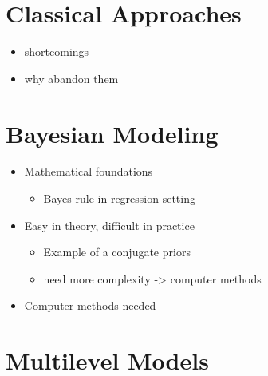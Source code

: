 \documentclass[
]{article}
\providecommand{\tightlist}{%
  \setlength{\itemsep}{0pt}\setlength{\parskip}{0pt}}
\begin{document}
\hypertarget{classical-approaches}{%
\section{Classical Approaches}\label{classical-approaches}}

\begin{itemize}
\tightlist
\item
  shortcomings
\item
  why abandon them
\end{itemize}

\hypertarget{bayesian-modeling}{%
\section{Bayesian Modeling}\label{bayesian-modeling}}

\begin{itemize}
\tightlist
\item
  Mathematical foundations

  \begin{itemize}
  \tightlist
  \item
    Bayes rule in regression setting
  \end{itemize}
\item
  Easy in theory, difficult in practice

  \begin{itemize}
  \tightlist
  \item
    Example of a conjugate priors
  \item
    need more complexity -\textgreater{} computer methods
  \end{itemize}
\item
  Computer methods needed
\end{itemize}

\hypertarget{multilevel-models}{%
\section{Multilevel Models}\label{multilevel-models}}
\end{document}
